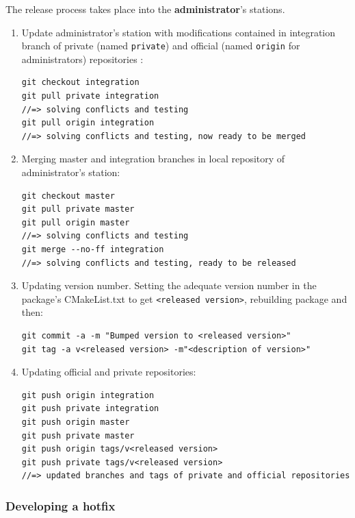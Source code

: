 \documentclass[12pt,a4paper]{article}
\begin{document}
The release process takes place into the \textbf{administrator}'s stations.
\begin{enumerate}
\item Update administrator's station with modifications contained in integration branch of private (named \texttt{private}) and official (named \texttt{origin} for administrators) repositories :
\begin{verbatim}
git checkout integration
git pull private integration
//=> solving conflicts and testing
git pull origin integration
//=> solving conflicts and testing, now ready to be merged
\end{verbatim}

\item Merging master and integration branches in local repository of administrator's station:
\begin{verbatim}
git checkout master
git pull private master
git pull origin master
//=> solving conflicts and testing
git merge --no-ff integration
//=> solving conflicts and testing, ready to be released
\end{verbatim}

\item Updating version number. Setting the adequate version number in the package's CMakeList.txt to get \texttt{<released version>}, rebuilding package and then:
\begin{verbatim}
git commit -a -m "Bumped version to <released version>"
git tag -a v<released version> -m"<description of version>"
\end{verbatim}

\item Updating official and private repositories:
\begin{verbatim}
git push origin integration
git push private integration
git push origin master
git push private master
git push origin tags/v<released version>
git push private tags/v<released version>
//=> updated branches and tags of private and official repositories
\end{verbatim}
\end{enumerate}

\subsubsection{Developing a hotfix}
\end{document}
